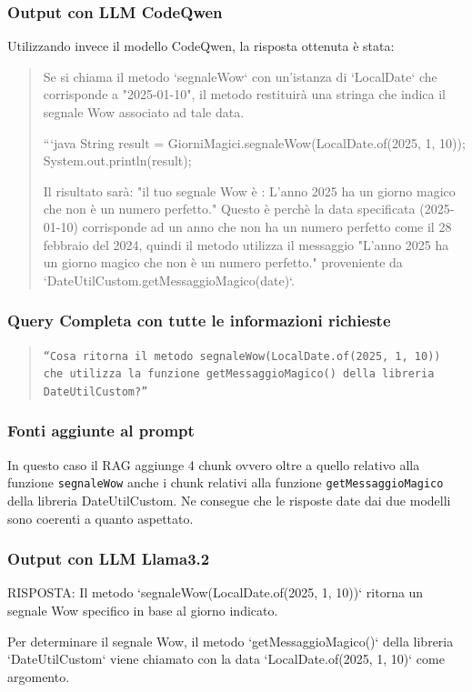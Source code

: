 \documentclass[12pt,a4paper,openright,twoside]{book}
\begin{document}
\subsubsection{Output con LLM CodeQwen}
Utilizzando invece il modello CodeQwen, la risposta ottenuta è stata:
\begin{quote}
    Se si chiama il metodo `segnaleWow` con un'istanza di `LocalDate` che corrisponde a "2025-01-10", il metodo restituirà una stringa che indica il segnale Wow associato ad tale data.

    ```java
    String result = GiorniMagici.segnaleWow(LocalDate.of(2025, 1, 10));
    System.out.println(result);
    
    Il risultato sarà: "il tuo segnale Wow è : L'anno 2025 ha un giorno magico che non è un numero perfetto."
    Questo è perchè la data specificata (2025-01-10) corrisponde ad un anno che non ha un numero perfetto come il 28 febbraio del 2024, quindi il metodo utilizza il messaggio "L'anno 2025 ha un giorno magico che non è un numero perfetto." proveniente da `DateUtilCustom.getMessaggioMagico(date)`.
\end{quote}

\subsubsection{Query Completa con tutte le informazioni richieste}
\begin{quote}
    \texttt{``Cosa ritorna il metodo segnaleWow(LocalDate.of(2025, 1, 10)) che utilizza la funzione getMessaggioMagico() della libreria DateUtilCustom?''}
\end{quote}
\subsubsection{Fonti aggiunte al prompt}
In questo caso il RAG aggiunge 4 chunk ovvero oltre a quello relativo alla funzione \texttt{segnaleWow} anche i chunk relativi alla funzione \texttt{getMessaggioMagico} della libreria DateUtilCustom.
Ne consegue che le risposte date dai due modelli sono coerenti a quanto aspettato.
\subsubsection{Output con LLM Llama3.2}
RISPOSTA:
Il metodo `segnaleWow(LocalDate.of(2025, 1, 10))` ritorna un segnale Wow specifico in base al giorno indicato.

Per determinare il segnale Wow, il metodo `getMessaggioMagico()` della libreria `DateUtilCustom` viene chiamato con la data `LocalDate.of(2025, 1, 10)` come argomento.
\end{document}
